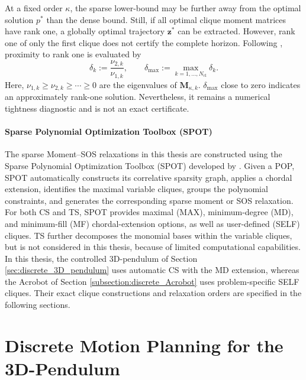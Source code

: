 At a fixed order $\kappa$, the sparse lower-bound may
be further away from the optimal solution $p^*$ than the dense bound. 
Still, if all optimal clique moment matrices have rank one, a globally optimal 
trajectory $\bm{z}^*$ can be extracted. However, rank one of only the first
clique does not certify the complete horizon. Following \cite{Sangli2025}, proximity to rank one is
evaluated by
\begin{equation}
 \delta_k:=\frac{\nu_{2,k}}{\nu_{1,k}},
 \qquad
 \delta_{\max}:=\max_{k=1,\ldots,N_{\mathrm{cl}}}\delta_k.
 \label{eq:numerical_rank_metric}
\end{equation}
Here, 
\(\nu_{1,k}\geq\nu_{2,k}\geq\cdots\geq0\) are the eigenvalues of
\(\bm{M}_{\kappa,k}\). \(\delta_{\max}\) close to zero indicates an approximately rank-one solution.
 Nevertheless, it remains a numerical tightness diagnostic and is not an exact certificate.

\paragraph{Sparse Polynomial Optimization Toolbox (SPOT)}
The sparse Moment--SOS relaxations in this thesis are constructed 
using the Sparse Polynomial Optimization Toolbox (SPOT) developed by 
\cite{Kang_2025Global}. Given a POP, SPOT automatically constructs its 
correlative sparsity graph, applies a chordal extension, identifies 
the maximal variable cliques, groups the polynomial constraints, and 
generates the corresponding sparse moment or SOS relaxation. For both 
CS and TS, SPOT provides maximal (MAX), minimum-degree (MD), and minimum-fill 
(MF) chordal-extension options, as well as user-defined (SELF) cliques. TS further 
decomposes the monomial bases within the variable cliques, but is not considered 
in this thesis, because of limited computational capabilities. 
In this thesis, the controlled 3D-pendulum of Section \ref{sec:discrete_3D_pendulum} uses automatic CS with the MD 
extension, whereas the Acrobot of Section \ref{subsection:discrete_Acrobot} uses problem-specific SELF cliques. 
Their exact clique constructions and relaxation orders are specified 
in the following sections.

\newpage

\section{Discrete Motion Planning for the 3D-Pendulum}
\label{sec:discrete_motion_planning_3d_pendulum}

